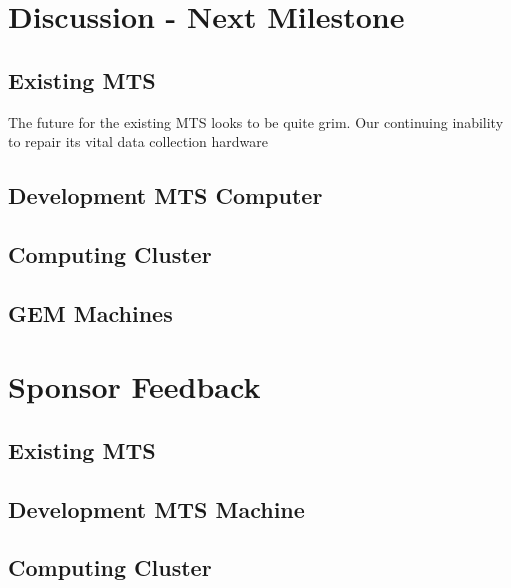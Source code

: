 \documentclass[12pt]{article}
\newcommand\tab[1][1cm]{\hspace*{#1}}
\begin{document}
\section{Discussion - Next Milestone}

\subsection{Existing MTS}

\tab The future for the existing MTS looks to be quite grim. Our continuing
inability to repair its vital data collection hardware 

\subsection{Development MTS Computer}

\tab 

\subsection{Computing Cluster}

\tab 

\subsection{GEM Machines}

\tab 

\section{Sponsor Feedback}

\subsection{Existing MTS}

\vspace{1in}

\subsection{Development MTS Machine}

\vspace{1in}

\subsection{Computing Cluster}

\vspace{1in}
\end{document}
